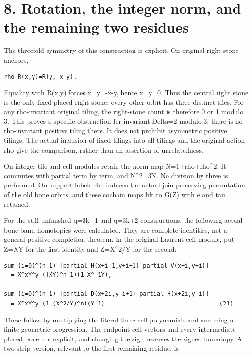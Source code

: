 \documentclass[
  10pt,
]{scrreprt}
\begin{document}
\section{8. Rotation, the integer norm, and the remaining two
residues}\label{edition-11-section-12}

The threefold symmetry of this construction is explicit. On original
right-stone anchors,

\begin{verbatim}
rho R(x,y)=R(y,-x-y).
\end{verbatim}

Equality with R(x,y) forces x=y=-x-y, hence x=y=0. Thus the central
right stone is the only fixed placed right stone; every other orbit has
three distinct tiles. For any rho-invariant original tiling, the
right-stone count is therefore 0 or 1 modulo 3. This proves a specific
obstruction for invariant Delta=2 modulo 3: there is no rho-invariant
positive tiling there. It does not prohibit asymmetric positive tilings.
The actual inclusion of fixed tilings into all tilings and the original
action rho give the comparison, rather than an assertion of
unrelatedness.

On integer tile and cell modules retain the norm map N=1+rho+rho\^{}2.
It commutes with partial term by term, and N\^{}2=3N. No division by
three is performed. On support labels rho induces the actual
join-preserving permutation of the old bone orbits, and these cochain
maps lift to G(Z) with e and tau retained.

For the still-unfinished q=3k+1 and q=3k+2 constructions, the following
actual bone-band homotopies were calculated. They are complete
identities, not a general positive completion theorem. In the original
Laurent cell module, put Z=XY for the first identity and Z=X\^{}2/Y for
the second:

\begin{verbatim}
sum_(i=0)^(n-1) [partial H(x+i-1,y+i+1)-partial V(x+i,y+i)]
  = X^xY^y ((XY)^n-1)(1-X^-1Y),

sum_(i=0)^(n-1) [partial D(x+2i,y-i+1)-partial H(x+2i,y-i)]
  = X^xY^y (1-(X^2/Y)^n)(Y-1).                                (21)
\end{verbatim}

These follow by multiplying the literal three-cell polynomials and
summing a finite geometric progression. The endpoint cell vectors and
every intermediate placed bone are explicit, and changing the sign
reverses the signed homotopy. A two-strip version, relevant to the first
remaining residue, is
\end{document}

